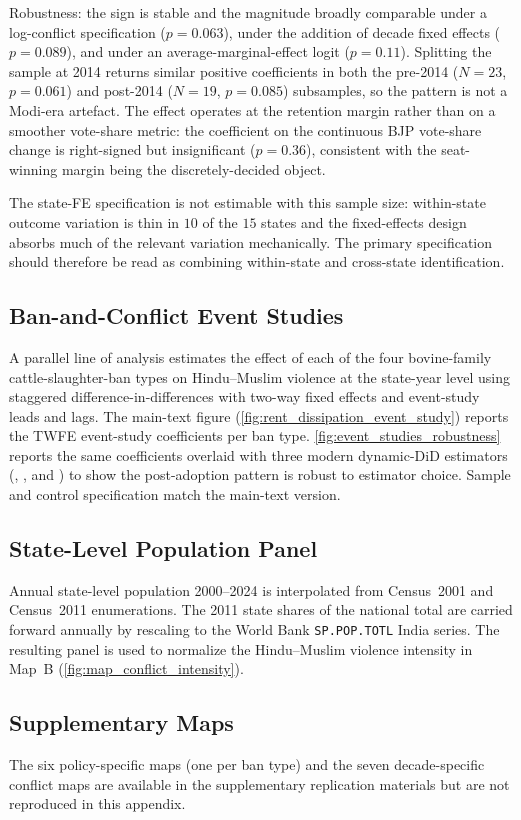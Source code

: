 Robustness: the sign is stable and the magnitude broadly comparable under a
log-conflict specification ($p=0.063$), under the addition of decade fixed
effects ($p=0.089$), and under an average-marginal-effect logit
($p=0.11$). Splitting the sample at 2014 returns similar positive
coefficients in both the pre-2014 ($N=23$, $p=0.061$) and post-2014
($N=19$, $p=0.085$) subsamples, so the pattern is not a Modi-era
artefact. The effect operates at the retention margin rather than on a
smoother vote-share metric: the coefficient on the continuous BJP
vote-share change is right-signed but insignificant ($p=0.36$), consistent
with the seat-winning margin being the discretely-decided object.

The state-FE specification is not estimable with this sample size:
within-state outcome variation is thin in $10$ of the $15$ states and the
fixed-effects design absorbs much of the relevant variation mechanically.
The primary specification should therefore be read as combining
within-state and cross-state identification.

\subsection{Ban-and-Conflict Event Studies} \label{app:event_studies}

A parallel line of analysis estimates the effect of each of the four
bovine-family cattle-slaughter-ban types on Hindu--Muslim violence at the
state-year level using staggered difference-in-differences with two-way
fixed effects and event-study leads and lags. The main-text figure
(\autoref{fig:rent_dissipation_event_study}) reports the TWFE event-study
coefficients per ban type. \autoref{fig:event_studies_robustness} reports
the same coefficients overlaid with three modern dynamic-DiD estimators
(\citet*{cengizEffectMinimumWages2019}, \citet*{gardnerTwostageDifferencesDifferences2022}, and \citet*{liuPracticalGuideCounterfactual2024})
to show the post-adoption pattern is robust to estimator choice. Sample
and control specification match the main-text version.



\subsection{State-Level Population Panel} \label{app:population}

Annual state-level population 2000--2024 is interpolated from
Census~2001 and Census~2011 enumerations. The 2011 state shares of the
national total are carried forward annually by rescaling to the World Bank
\texttt{SP.POP.TOTL} India series. The resulting panel is used to
normalize the Hindu--Muslim violence intensity in Map~B
(\autoref{fig:map_conflict_intensity}).

\subsection{Supplementary Maps} \label{app:supplementary_maps}

The six policy-specific maps (one per ban type) and the seven decade-specific
conflict maps are available in the supplementary replication materials but are not reproduced in this appendix.

